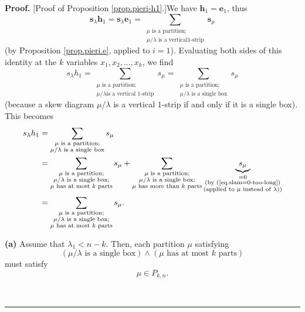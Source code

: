 \documentclass[numbers=enddot,12pt,final,onecolumn,notitlepage]{scrartcl}%
\theoremstyle{definition}
\newenvironment{proof}[1][Proof]{\noindent\textbf{#1.} }{\ \rule{0.5em}{0.5em}}
\let\sumnonlimits\sum
\renewcommand{\sum}{\sumnonlimits\limits}
\begin{document}
\begin{proof}
[Proof of Proposition \ref{prop.pieri-h1}.]We have $\mathbf{h}_{1}%
=\mathbf{e}_{1}$, thus%
\[
\mathbf{s}_{\lambda}\mathbf{h}_{1}=\mathbf{s}_{\lambda}\mathbf{e}_{1}%
=\sum_{\substack{\mu\text{ is a partition;}\\\mu/\lambda\text{ is a vertical
}1\text{-strip}}}\mathbf{s}_{\mu}%
\]
(by Proposition \ref{prop.pieri.e}, applied to $i=1$). Evaluating both sides
of this identity at the $k$ variables $x_{1},x_{2},\ldots,x_{k}$, we find%
\[
s_{\lambda}h_{1}=\sum_{\substack{\mu\text{ is a partition;}\\\mu/\lambda\text{
is a vertical }1\text{-strip}}}s_{\mu}=\sum_{\substack{\mu\text{ is a
partition;}\\\mu/\lambda\text{ is a single box}}}s_{\mu}%
\]
(because a skew diagram $\mu/\lambda$ is a vertical $1$-strip if and only if
it is a single box). This becomes%
\begin{align}
s_{\lambda}h_{1}  &  =\sum_{\substack{\mu\text{ is a partition;}\\\mu
/\lambda\text{ is a single box}}}s_{\mu}\nonumber\\
&  =\sum_{\substack{\mu\text{ is a partition;}\\\mu/\lambda\text{ is a single
box;}\\\mu\text{ has at most }k\text{ parts}}}s_{\mu}+\sum_{\substack{\mu
\text{ is a partition;}\\\mu/\lambda\text{ is a single box;}\\\mu\text{ has
more than }k\text{ parts}}}\underbrace{s_{\mu}}_{\substack{=0\\\text{(by
(\ref{eq.slam=0-too-long})}\\\text{(applied to }\mu\text{ instead of }%
\lambda\text{))}}}\nonumber\\
&  =\sum_{\substack{\mu\text{ is a partition;}\\\mu/\lambda\text{ is a single
box;}\\\mu\text{ has at most }k\text{ parts}}}s_{\mu}.
\label{pf.prop.pieri-h1.2}%
\end{align}


\textbf{(a)} Assume that $\lambda_{1}<n-k$. Then, each partition $\mu$
satisfying%
\begin{equation}
\left(  \mu/\lambda\text{ is a single box}\right)  \wedge\left(  \mu\text{ has
at most }k\text{ parts}\right)  \label{pf.prop.pieri-h1.a.1ass}%
\end{equation}
must satisfy%
\begin{equation}
\mu\in P_{k,n}. \label{pf.prop.pieri-h1.a.1}%
\end{equation}



\end{proof}
\end{document}
